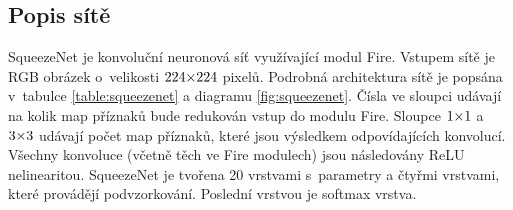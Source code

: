 \subsection{Popis sítě}
\label{sub:squeezenet_desc}

SqueezeNet je konvoluční neuronová síť využívající modul Fire.
Vstupem sítě je RGB obrázek o~velikosti $\sisetup{tight-spacing=true}224{\times}224$ pixelů.
Podrobná architektura sítě je popsána v~tabulce \ref{table:squeezenet} a diagramu \ref{fig:squeezenet}.
Čísla ve sloupci  udávají na kolik map příznaků bude redukován vstup do modulu Fire.
Sloupce $\sisetup{tight-spacing=true}1{\times}1$ a $\sisetup{tight-spacing=true}3{\times}3$ udávají počet map příznaků, které jsou výsledkem odpovídajících konvolucí.
Všechny konvoluce (včetně těch ve Fire modulech) jsou následovány ReLU nelinearitou.
SqueezeNet je tvořena 20 vrstvami s~parametry a čtyřmi vrstvami, které provádějí podvzorkování.
Poslední vrstvou je softmax vrstva.

